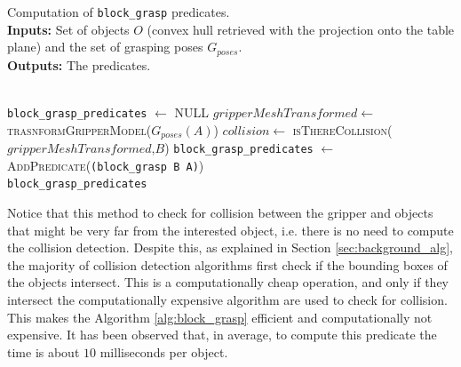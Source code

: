 \begin{algorithm}
\caption{Computation of \texttt{block\_grasp} predicates. \\
\textbf{Inputs:} Set of objects $O$ (convex hull retrieved with the projection onto the table plane) and  the set of grasping poses $G_{poses}$.\\
\textbf{Outputs:} The  predicates.
}\label{alg:block_grasp}
\begin{algorithmic}
\\
  \texttt{block\_grasp\_predicates} $\gets$ \textsc{NULL}
  \State $gripperMeshTransformed \gets$ \textsc{trasnformGripperModel}($G_{poses}(A)$)
	\State $collision \gets$ \textsc{isThereCollision($gripperMeshTransformed$,$B$)}
		\State \texttt{block\_grasp\_predicates} $\gets$ \textsc{AddPredicate}(\texttt{(block\_grasp B A)})
	\EndIf
  \EndIf
\EndFor
\EndFor \\
\Return  \texttt{block\_grasp\_predicates}
\EndFunction
\end{algorithmic}
\end{algorithm}   
 
Notice that this method  to check for collision between the gripper and objects that might be very far from the interested object, i.e. there is no need to compute the collision detection.  Despite this, as explained in Section \ref{sec:background_alg}, the majority of collision detection algorithms first check if the bounding boxes of the objects intersect. This is a computationally cheap operation, and only if they intersect the computationally expensive algorithm are used to check for collision. This makes the Algorithm \ref{alg:block_grasp} efficient and computationally not expensive. It has been observed that, in average, to compute this predicate the time is about $10$ milliseconds per object. 
 
